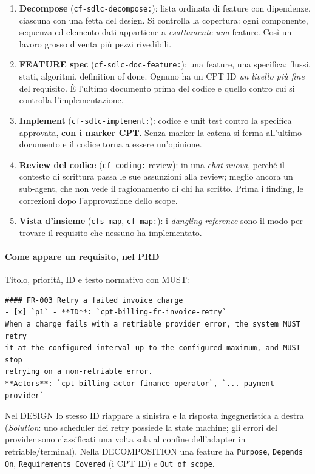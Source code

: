 \documentclass[a4paper,12pt]{article}
\begin{document}
\begin{enumerate}
  \item \textbf{Decompose} (\texttt{cf-sdlc-decompose:}): lista ordinata di feature con
        dipendenze, ciascuna con una fetta del design. Si controlla la copertura: ogni
        componente, sequenza ed elemento dati appartiene a \emph{esattamente una}
        feature. Così un lavoro grosso diventa più pezzi rivedibili.
  \item \textbf{FEATURE spec} (\texttt{cf-sdlc-doc-feature:}): una feature, una
        specifica: flussi, stati, algoritmi, definition of done. Ognuno ha un CPT ID
        \emph{un livello più fine} del requisito. È l'ultimo documento prima del
        codice e quello contro cui si controlla l'implementazione.
  \item \textbf{Implement} (\texttt{cf-sdlc-implement:}): codice e unit test contro la
        specifica approvata, \textbf{con i marker CPT}. Senza marker la catena si ferma
        all'ultimo documento e il codice torna a essere un'opinione.
  \item \textbf{Review del codice} (\texttt{cf-coding:} review): in una \emph{chat
        nuova}, perché il contesto di scrittura passa le sue assunzioni alla review;
        meglio ancora un sub-agent, che non vede il ragionamento di chi ha scritto.
        Prima i finding, le correzioni dopo l'approvazione dello scope.
  \item \textbf{Vista d'insieme} (\texttt{cfs map}, \texttt{cf-map:}): i \emph{dangling
        reference} sono il modo per trovare il requisito che nessuno ha implementato.
\end{enumerate}

\paragraph{Come appare un requisito, nel PRD} Titolo, priorità, ID e testo normativo con
MUST:
\begin{verbatim}
#### FR-003 Retry a failed invoice charge
- [x] `p1` - **ID**: `cpt-billing-fr-invoice-retry`
When a charge fails with a retriable provider error, the system MUST retry
it at the configured interval up to the configured maximum, and MUST stop
retrying on a non-retriable error.
**Actors**: `cpt-billing-actor-finance-operator`, `...-payment-provider`
\end{verbatim}
Nel DESIGN lo stesso ID riappare a sinistra e la risposta ingegneristica a destra
(\emph{Solution}: uno scheduler dei retry possiede la state machine; gli errori del
provider sono classificati una volta sola al confine dell'adapter in retriable/terminal).
Nella DECOMPOSITION una feature ha \texttt{Purpose}, \texttt{Depends On},
\texttt{Requirements Covered} (i CPT ID) e \texttt{Out of scope}.
\end{document}
